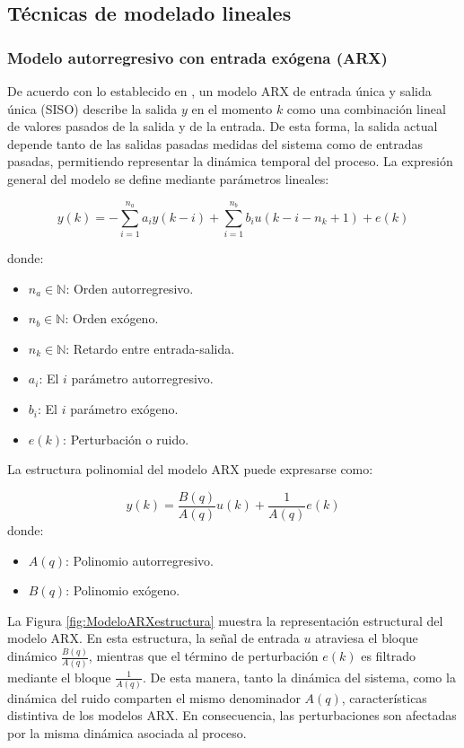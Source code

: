 \documentclass[11pt]{report}
\begin{document}
\subsection{Técnicas de modelado lineales}




\subsubsection{Modelo autorregresivo con entrada exógena (ARX)}


De acuerdo con lo establecido en \cite{ljung1999system}, un modelo ARX de entrada única y salida única (SISO) describe la salida $y$ en el momento $k$ como una combinación lineal de valores pasados de la salida y de la entrada. De esta forma, la salida actual depende tanto de las salidas pasadas medidas del sistema como de entradas pasadas, permitiendo representar la dinámica temporal del proceso. La expresión general del modelo se define mediante parámetros lineales: 

\begin{equation}    \label{ecuacionARX}
    y(k)=-\sum\limits_{i=1}^{n_{a}} a_{i}y(k-i)+\sum\limits_{i=1}^{n_{b}} b_{i}u(k-i-n_{k}+1) +e(k) 
\end{equation}
    


donde:
\begin{itemize}
    \item $n_{a} \in \mathbb{N}$: Orden autorregresivo.
\item $n_{b} \in \mathbb{N}$: Orden exógeno.
\item $n_{k} \in \mathbb{N}$: Retardo entre entrada-salida.
\item $a_{i}$: El $i$ parámetro autorregresivo.
\item $b_{i}$: El $i$ parámetro exógeno.
\item $e(k)$: Perturbación o ruido.
\end{itemize}

La estructura polinomial del modelo ARX \cite{Muftah2021} puede expresarse como:

\begin{equation}    \label{ecuacionpolARX}
y(k)=\frac{B(q)}{A(q)}u(k)+\frac{1}{A(q)}e(k)
\end{equation}
donde:
\begin{itemize}
    \item $A(q)$: Polinomio autorregresivo.
    \item $B(q)$: Polinomio exógeno.
    
\end{itemize}
La Figura \ref{fig:ModeloARXestructura} muestra la representación estructural del modelo ARX. En esta estructura, la señal de entrada $u$ atraviesa el bloque dinámico $\frac{B(q)}{A(q)}$, mientras que el término de perturbación $e(k)$ es filtrado mediante el bloque $\frac{1}{A(q)}$. De esta manera, tanto la dinámica del sistema, como la dinámica del ruido comparten el mismo denominador $A(q)$, características distintiva de los modelos ARX. En consecuencia, las perturbaciones son afectadas por la misma dinámica asociada al proceso.
\end{document}
